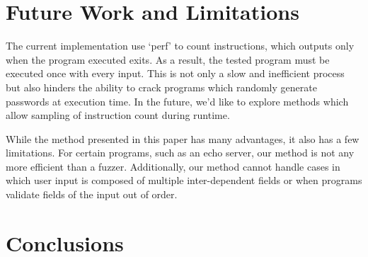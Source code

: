\documentclass[10pt,twocolumn]{article}
\begin{document}
\section{Future Work and Limitations}

The current implementation use `perf' to count instructions, which outputs only when the program executed exits.
As a result, the tested program must be executed once with every input.
This is not only a slow and inefficient process but also hinders the ability to crack programs which randomly generate passwords at execution time.
In the future, we'd like to explore methods which allow sampling of instruction count during runtime.

While the method presented in this paper has many advantages, it also has a few limitations.
For certain programs, such as an echo server, our method is not any more efficient than a fuzzer.
Additionally, our method cannot handle cases in which user input is composed of multiple inter-dependent fields or when programs validate fields of the input out of order.

\section{Conclusions}
\end{document}

